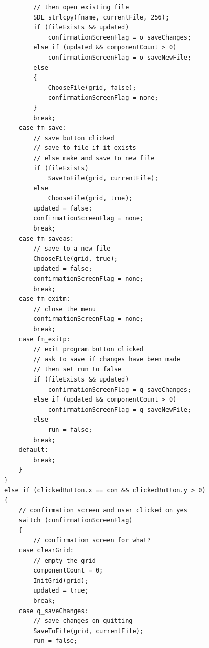 \documentclass[report]{subfiles}
\begin{document}
\begin{lstlisting}
                    // then open existing file
                    SDL_strlcpy(fname, currentFile, 256);
                    if (fileExists && updated)
                        confirmationScreenFlag = o_saveChanges;
                    else if (updated && componentCount > 0)
                        confirmationScreenFlag = o_saveNewFile;
                    else
                    {
                        ChooseFile(grid, false);
                        confirmationScreenFlag = none;
                    }
                    break;
                case fm_save:
                    // save button clicked
                    // save to file if it exists
                    // else make and save to new file
                    if (fileExists)
                        SaveToFile(grid, currentFile);
                    else
                        ChooseFile(grid, true);
                    updated = false;
                    confirmationScreenFlag = none;
                    break;
                case fm_saveas:
                    // save to a new file
                    ChooseFile(grid, true);
                    updated = false;
                    confirmationScreenFlag = none;
                    break;
                case fm_exitm:
                    // close the menu
                    confirmationScreenFlag = none;
                    break;
                case fm_exitp:
                    // exit program button clicked
                    // ask to save if changes have been made
                    // then set run to false
                    if (fileExists && updated)
                        confirmationScreenFlag = q_saveChanges;
                    else if (updated && componentCount > 0)
                        confirmationScreenFlag = q_saveNewFile;
                    else
                        run = false;
                    break;
                default:
                    break;
                }
            }
            else if (clickedButton.x == con && clickedButton.y > 0)
            {
                // confirmation screen and user clicked on yes
                switch (confirmationScreenFlag)
                {
                    // confirmation screen for what?
                case clearGrid:
                    // empty the grid
                    componentCount = 0;
                    InitGrid(grid);
                    updated = true;
                    break;
                case q_saveChanges:
                    // save changes on quitting
                    SaveToFile(grid, currentFile);
                    run = false;

\end{lstlisting}
\end{document}
